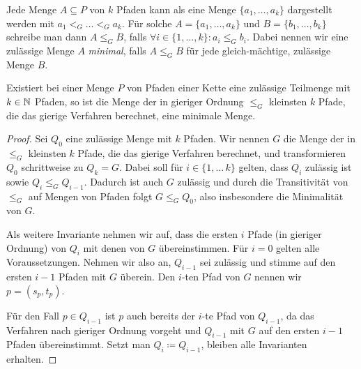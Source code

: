 Jede Menge $A \subseteq P$ von $k$ Pfaden kann als eine Menge $\{a_1, \dots, a_k\}$ dargestellt werden mit
$a_1 <_G \dots <_G a_k$.
Für solche $A=\{a_1,\dots,a_k\}$ und $B=\{b_1,\dots,b_k\}$ schreibe man dann $A \leq_G B$, falls $\forall i \in \{1,\dots,k\}\colon a_i \leq_G b_i$.
Dabei nennen wir eine zulässige Menge $A$ {\em minimal}, falls $A \leq_G B$ für jede gleich-mächtige, zulässige Menge $B$.
\begin{lemma}\label{lem:optimalityGreedyAlgorithm}
    Existiert bei einer Menge $P$ von Pfaden einer Kette eine zulässige Teilmenge mit $k \in \mathbb N$ Pfaden, so ist die
    Menge der in gieriger Ordnung $\leq_G$ kleinsten $k$ Pfade, die das gierige Verfahren berechnet, eine minimale Menge.
\end{lemma}
\begin{proof}
    Sei $Q_0$ eine zulässige Menge mit $k$ Pfaden.
    Wir nennen $G$ die Menge der in $\leq_G$ kleinsten $k$ Pfade, die das gierige Verfahren berechnet, und
    transformieren $Q_0$ schrittweise zu $Q_k = G$.
    Dabei soll für $i \in \{1,\dots\,k\}$ gelten, dass $Q_i$ zulässig ist sowie $Q_i \leq_G Q_{i-1}$.
    Dadurch ist auch $G$ zulässig und durch die Transitivität von $\leq_G$ auf Mengen von Pfaden folgt $G \leq_G Q_0$,
    also insbesondere die Minimalität von $G$.

    Als weitere Invariante nehmen wir auf, dass die ersten $i$ Pfade (in gieriger Ordnung) von $Q_i$ mit denen von $G$
    übereinstimmen.
    Für $i=0$ gelten alle Voraussetzungen.
    Nehmen wir also an, $Q_{i-1}$ sei zulässig und stimme auf den ersten $i-1$ Pfaden mit $G$ überein.
    Den $i$-ten Pfad von $G$ nennen wir $p=(s_p, t_p)$.

    Für den Fall $p \in Q_{i-1}$ ist $p$ auch bereits der $i$-te Pfad von $Q_{i-1}$, da das Verfahren nach
    gieriger Ordnung vorgeht und $Q_{i-1}$ mit $G$ auf den ersten $i-1$ Pfaden übereinstimmt.
    Setzt man $Q_i \coloneqq Q_{i-1}$, bleiben alle Invarianten erhalten.


\end{proof}
